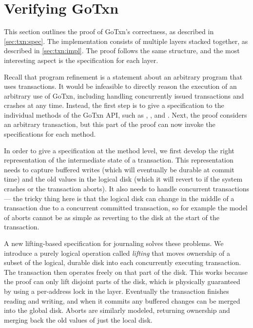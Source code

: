 \section{Verifying GoTxn}
\label{sec:txn:proof}

This section outlines the proof of GoTxn's correctness, as described in
\cref{sec:txn:spec}. The implementation consists of multiple layers stacked
together, as described in \cref{sec:txn:impl}. The proof follows the same
structure, and the most interesting aspect is the specification for each layer.

Recall that program refinement is a statement about an arbitrary program that
uses transactions. It would be infeasible to directly reason the execution of an
arbitrary use of GoTxn, including handling concurrently issued transactions and
crashes at any time. Instead, the first step is to give a specification to the
individual methods of the GoTxn API, such as , , and
. Next, the proof considers an arbitrary transaction, but this part
of the proof can now invoke the specifications for each method.

In order to give a specification at the method level, we first
develop the right representation of the intermediate state of a transaction.
This representation needs to capture buffered writes (which will eventually be
durable at commit time) and the old values in the logical disk (which it will
revert to if the system crashes or the transaction aborts). It also needs to
handle concurrent transactions --- the tricky thing here is that the logical
disk can change in the middle of a transaction due to a concurrent committed
transaction, so for example the model of aborts cannot be as simple as reverting
to the disk at the start of the transaction.

A new lifting-based specification for journaling solves these problems. We
introduce a purely logical operation called \emph{lifting} that moves ownership
of a subset of the logical, durable disk into each concurrently executing
transaction. The transaction then operates freely on that part of the disk. This
works because the proof can only lift disjoint parts of the disk, which is
physically guaranteed by using a per-address lock in the  layer.
Eventually the transaction finishes reading and writing, and when it commits any
buffered changes can be merged into the global disk. Aborts are similarly
modeled, returning ownership and merging back the old values of just the local
disk.

